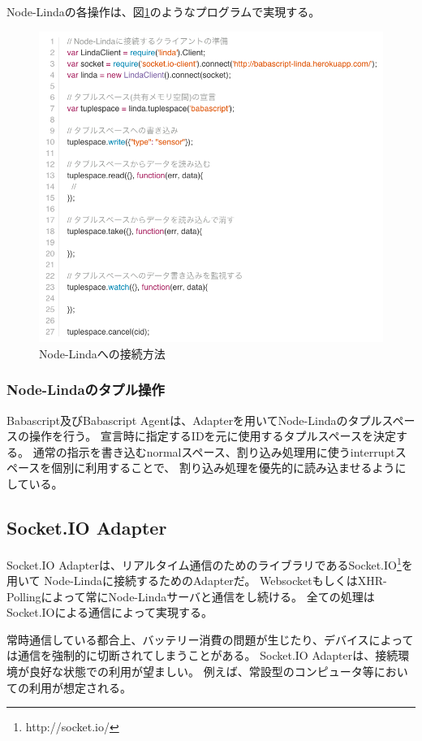 Node-Lindaの各操作は、図\ref{fig:linda-usage}のようなプログラムで実現する。

\begin{figure}[htbp]
  \begin{center}
    \includegraphics[width=.7\linewidth,bb=0 0 770 695]{images/linda-usage.js.png}
  \end{center}
  \caption{Node-Lindaへの接続方法}
  \label{fig:linda-usage}
\end{figure}

\subsubsection{Node-Lindaのタプル操作}\label{node-lindaux306eux30bfux30d7ux30ebux64cdux4f5c}

Babascript及びBabascript
Agentは、Adapterを用いてNode-Lindaのタプルスペースの操作を行う。
宣言時に指定するIDを元に使用するタプルスペースを決定する。
通常の指示を書き込むnormalスペース、割り込み処理用に使うinterruptスペースを個別に利用することで、
割り込み処理を優先的に読み込ませるようにしている。

\subsection{Socket.IO Adapter}\label{socket.io-adapter}

Socket.IO
Adapterは、リアルタイム通信のためのライブラリであるSocket.IO\footnote{http://socket.io/}を用いて
Node-Lindaに接続するためのAdapterだ。
WebsocketもしくはXHR-Pollingによって常にNode-Lindaサーバと通信をし続ける。
全ての処理はSocket.IOによる通信によって実現する。

常時通信している都合上、バッテリー消費の問題が生じたり、デバイスによっては通信を強制的に切断されてしまうことがある。
Socket.IO Adapterは、接続環境が良好な状態での利用が望ましい。
例えば、常設型のコンピュータ等においての利用が想定される。

